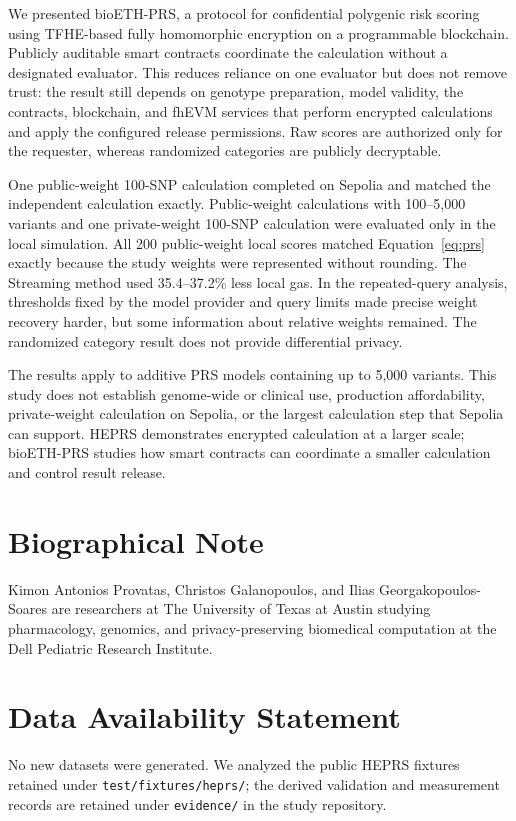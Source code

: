 \documentclass[10pt]{article}
\begin{document}
We presented bioETH-PRS, a protocol for confidential polygenic risk
scoring using TFHE-based fully homomorphic encryption on a programmable blockchain.
Publicly auditable smart contracts coordinate the calculation without a designated
evaluator.  This reduces reliance on one evaluator but does not
remove trust: the result still depends on genotype preparation, model validity, the
contracts, blockchain, and fhEVM services that perform encrypted calculations and
apply the configured release permissions.  Raw scores are authorized only for the
requester, whereas randomized categories are publicly decryptable.

One public-weight 100-SNP calculation completed on Sepolia and matched the independent
calculation exactly.  Public-weight calculations with 100--5,000 variants and one
private-weight 100-SNP calculation were evaluated only in the local simulation.  All
200 public-weight local scores matched
Equation~\ref{eq:prs} exactly because the study weights were represented without
rounding.  The Streaming method used 35.4--37.2\% less local gas.  In the repeated-query
analysis, thresholds fixed by the model provider and query limits made precise weight
recovery harder,
but some information about relative weights remained.  The randomized category result
does not provide differential privacy.

The results apply to additive PRS models containing up to 5,000 variants.  This study
does not establish genome-wide or clinical use, production affordability,
private-weight calculation on Sepolia, or the largest calculation step that Sepolia can
support.  HEPRS demonstrates encrypted calculation at a larger scale; bioETH-PRS studies
how smart contracts can coordinate a smaller calculation and control result release.

\section*{Biographical Note}
Kimon Antonios Provatas, Christos Galanopoulos, and Ilias Georgakopoulos-Soares are researchers at The University of Texas at Austin studying pharmacology, genomics, and privacy-preserving biomedical computation at the Dell Pediatric Research Institute.

\section*{Data Availability Statement}
No new datasets were generated.  We analyzed the public HEPRS fixtures retained under
\texttt{test/fixtures/heprs/}; the derived validation and measurement records are retained
under \texttt{evidence/} in the study repository.
\end{document}
